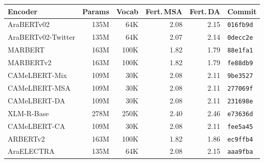 \begin{tabular}{lrrrrl}
\toprule
\textbf{Encoder} & \textbf{Params} & \textbf{Vocab} & \textbf{Fert.\,MSA} & \textbf{Fert.\,DA} & \textbf{Commit} \\
\midrule
AraBERTv02 & 135M & 64K & 2.08 & 2.15 & \texttt{016fb9d} \\
AraBERTv02-Twitter & 135M & 64K & 2.07 & 2.14 & \texttt{0decc2e} \\
MARBERT & 163M & 100K & 1.82 & 1.79 & \texttt{88e1fa1} \\
MARBERTv2 & 163M & 100K & 1.82 & 1.79 & \texttt{fe88db9} \\
CAMeLBERT-Mix & 109M & 30K & 2.08 & 2.11 & \texttt{9be3527} \\
CAMeLBERT-MSA & 109M & 30K & 2.08 & 2.11 & \texttt{277069f} \\
CAMeLBERT-DA & 109M & 30K & 2.08 & 2.11 & \texttt{231698e} \\
XLM-R-Base & 278M & 250K & 2.40 & 2.46 & \texttt{e73636d} \\
CAMeLBERT-CA & 109M & 30K & 2.08 & 2.11 & \texttt{fee5a45} \\
ARBERTv2 & 163M & 100K & 1.82 & 1.86 & \texttt{ec9ffb4} \\
AraELECTRA & 135M & 64K & 2.08 & 2.15 & \texttt{aaa9fba} \\
\bottomrule
\end{tabular}
